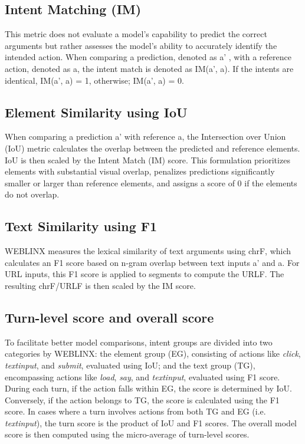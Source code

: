 \documentclass[11pt]{article}
\begin{document}
\subsection{Intent Matching (IM)}
This metric does not evaluate a model's capability to predict the correct arguments but rather assesses the model's ability to accurately identify the intended action. When comparing a prediction, denoted as 
a' , with a reference action, denoted as a, the intent match is denoted as IM(a', a). If the intents are identical,  IM(a', a) = 1, otherwise;  IM(a', a) = 0. 

\subsection{Element Similarity using IoU}
When comparing a prediction a' with reference a, the Intersection over Union (IoU) metric calculates the overlap between the predicted and reference elements. IoU is then scaled by the Intent Match (IM) score. This formulation prioritizes elements with substantial visual overlap, penalizes predictions significantly smaller or larger than reference elements, and assigns a score of 0 if the elements do not overlap.

\subsection{Text Similarity using F1}
WEBLINX measures the lexical similarity of text arguments using chrF, which calculates an F1 score based on n-gram overlap between text inputs a' and a. For URL inputs, this F1 score is applied to segments to compute the URLF. The resulting chrF/URLF is then scaled by the IM score.

\subsection{Turn-level score and overall score}
To facilitate better model comparisons, intent groups are divided into two categories by WEBLINX: the element group (EG), consisting of actions like \textit{click}, \textit{textinput}, and \textit{submit}, evaluated using IoU; and the text group (TG), encompassing actions like \textit{load}, \textit{say}, and \textit{textinput}, evaluated using F1 score. During each turn, if the action falls within EG, the score is determined by IoU. Conversely, if the action belongs to TG, the score is calculated using the F1 score. In cases where a turn involves actions from both TG and EG (i.e. \textit{textinput}), the turn score is the product of IoU and F1 scores. The overall model score is then computed using the micro-average of turn-level scores. 
\end{document}
